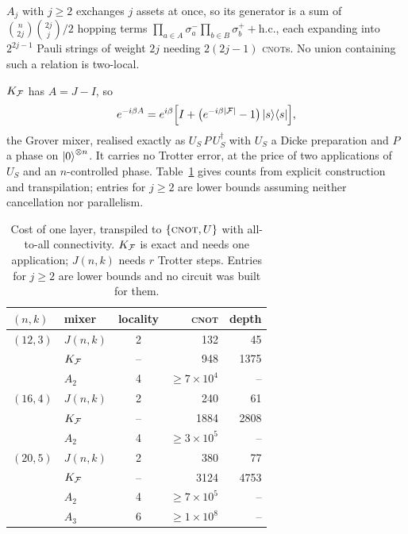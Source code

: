$A_j$ with $j\ge2$ exchanges $j$ assets at once, so its generator is a
sum of $\binom{n}{2j}\binom{2j}{j}/2$ hopping terms
$\prod_{a\in A}\sigma^-_a\prod_{b\in B}\sigma^+_b+\mathrm{h.c.}$, each
expanding into $2^{2j-1}$ Pauli strings of weight $2j$ needing $2(2j-1)$
\textsc{cnot}s. No union containing such a relation is two-local.

$K_{\mathcal{F}}$ has $A=J-I$, so
\begin{equation}
    e^{-i\beta A}=e^{i\beta}\Bigl[I
      +\bigl(e^{-i\beta|\mathcal{F}|}-1\bigr)\ket{s}\!\bra{s}\Bigr],
    \label{eq:grover-mixer}
\end{equation}
the Grover mixer, realised exactly as $U_S\,P\,U_S^{\dagger}$ with $U_S$
a Dicke preparation and $P$ a phase on $\ket{0}^{\otimes n}$. It carries
no Trotter error, at the price of two applications of $U_S$ and an
$n$-controlled phase. Table~\ref{tab:circuits} gives counts from explicit
construction and transpilation; entries for $j\ge2$ are lower bounds
assuming neither cancellation nor parallelism.

\begin{table}[t]
  \caption{Cost of one layer, transpiled to $\{\textsc{cnot},U\}$ with
  all-to-all connectivity. $K_{\mathcal{F}}$ is exact and needs one application;
  $J(n,k)$ needs $r$ Trotter steps. Entries for $j\ge2$ are lower bounds
  and no circuit was built for them.}
  \label{tab:circuits}
  \begin{ruledtabular}
  \begin{tabular}{llcrr}
    $(n,k)$ & mixer & locality & \textsc{cnot} & depth \\ \hline
    $(12,3)$ & $J(n,k)$ & 2  & 132  & 45   \\
             & $K_{\mathcal{F}}$ & -- & 948  & 1375 \\
             & $A_2$    & 4  & $\ge7\times10^{4}$ & -- \\[2pt]
    $(16,4)$ & $J(n,k)$ & 2  & 240  & 61   \\
             & $K_{\mathcal{F}}$ & -- & 1884 & 2808 \\
             & $A_2$    & 4  & $\ge3\times10^{5}$ & -- \\[2pt]
    $(20,5)$ & $J(n,k)$ & 2  & 380  & 77   \\
             & $K_{\mathcal{F}}$ & -- & 3124 & 4753 \\
             & $A_2$    & 4  & $\ge7\times10^{5}$ & -- \\
             & $A_3$    & 6  & $\ge1\times10^{8}$ & -- \\
  \end{tabular}
  \end{ruledtabular}
\end{table}

